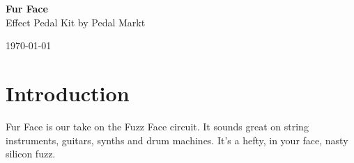 \documentclass[a4paper,12pt]{article}
\begin{document}
\begin{titlepage}
  \begin{center}
    \Large\textbf{Fur Face}\\
    \large{Effect Pedal Kit by Pedal Markt}
  \end{center}
  \vspace*{\fill}
  \begin{center}
    \today
  \end{center}
\end{titlepage}

\tableofcontents
\pagebreak

\section{Introduction}

Fur Face is our take on the Fuzz Face circuit. It sounds
great on string instruments, guitars, synths and drum
machines. It's a hefty, in your face, nasty silicon fuzz.
\end{document}
